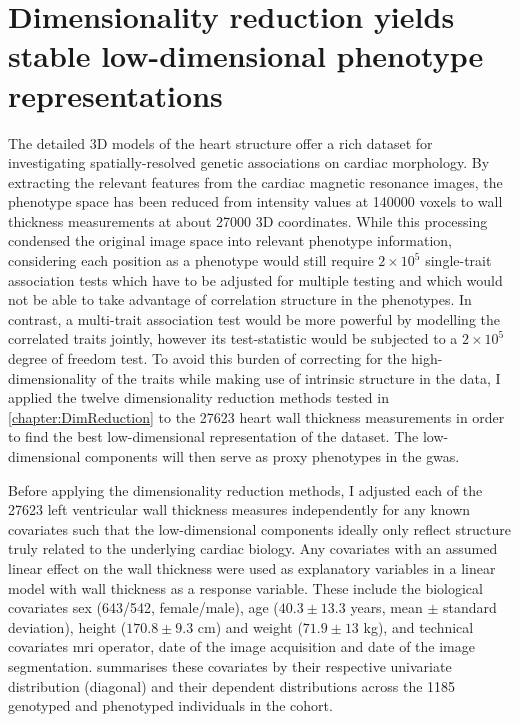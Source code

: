 \newpage
\section{Dimensionality reduction yields stable low-dimensional phenotype representations}
\label{section:DimRed-heart}
The detailed 3D models of the heart structure offer a rich dataset for investigating spatially-resolved genetic associations on cardiac morphology. By extracting the relevant features from the cardiac magnetic resonance images, the phenotype space has been reduced from intensity values at \num{140000} voxels to wall thickness measurements at about \num{27000} 3D coordinates. While this processing condensed the original image space into relevant phenotype information, considering each position as a phenotype would still require \(2\times 10^5\)  single-trait association tests which have to be adjusted for multiple testing and which would not be able to take advantage of correlation structure in the phenotypes. In contrast, a multi-trait association test would be more powerful by modelling the correlated traits jointly, however its test-statistic would be subjected to a \(2 \times 10^5\)  degree of freedom test. To avoid this burden of correcting for the high-dimensionality of the traits while making use of intrinsic structure in the data, I applied the twelve dimensionality reduction methods tested in \cref{chapter:DimReduction} to the \num{27623} heart wall thickness measurements in order to find the best low-dimensional representation of the dataset. The low-dimensional components will then serve as proxy phenotypes in the \gls{gwas}.

Before applying the dimensionality reduction methods, I adjusted each of the \num{27623} left ventricular wall thickness measures independently for any known covariates such that the low-dimensional components ideally only reflect structure truly related to the underlying cardiac biology. Any covariates with an assumed linear effect on the wall thickness were used as explanatory variables in a linear model with wall thickness as a response variable. These include the biological covariates sex (643/542, female/male), age (\( 40.3 \pm 13.3\) years, mean \( \pm\) standard deviation), height (\( 170.8 \pm 9.3\) cm) and weight (\( 71.9 \pm 13\) kg), and  technical covariates \gls{mri} operator, date of the image acquisition and date of the image segmentation.  summarises these covariates by their respective univariate distribution (diagonal) and their dependent distributions across the \num{1185} genotyped and phenotyped individuals in the cohort. 
 
